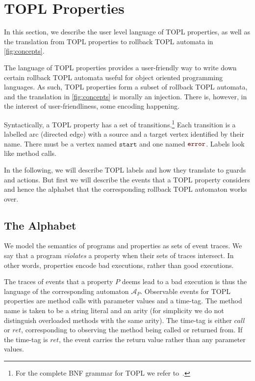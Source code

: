 \documentclass[9pt, preprint]{sigplanconf} %
\newcommand{\A}{\ensuremath{\mathcal{A}}}
\newcommand{\error}{\ensuremath{\textcolor{darkred}{\mathtt{error}}}\xspace}
\newcommand{\start}{\ensuremath{\mathtt{start}}\xspace}
\theoremstyle{definition}
\theoremstyle{remark}
\begin{document}
\section{TOPL Properties}\label{sec:topl} %

In this section, we describe the user level language of TOPL
properties, as well as the translation from TOPL properties to
rollback TOPL automata in \autoref{fig:concepts}.

The language of TOPL properties provides a user-friendly way to write down certain
rollback TOPL automata useful for object oriented programming
languages. As such, TOPL properties form a subset of rollback TOPL
automata, and the translation in \autoref{fig:concepts} is morally an
injection. There is, however, in the interest of user-friendliness,
some encoding happening.

Syntactically, a TOPL property has a set of transitions.\footnote{For
  the complete BNF grammar for TOPL we refer to~\cite{our-fool2011}.}
Each transition is a labelled arc (directed edge) with a source and a
target vertex identified by their name.
There must be a vertex named \start and one named \error.
Labels look like method calls.

In the following, we will describe TOPL labels and how they translate to guards
and actions. But first we will describe the events that a TOPL
property considers and hence the alphabet that the corresponding
rollback TOPL automaton works over.

\subsection{The Alphabet}

We model the semantics of programs and properties as sets of event
traces. We say that a program \emph{violates} a property when their sets of traces intersect.
In other words, properties encode bad executions, rather than good executions.

The traces of events that a property $P$ deems lead to a bad execution is thus the language
of the corresponding automaton $\A_P$. Observable events for TOPL properties are method calls
with parameter values and a time-tag. The method name is taken to be a
string literal and an arity (for simplicity we do not distinguish
overloaded methods with the same arity). The time-tag is either $call$ or $ret$,
corresponding to observing the method being called or returned
from. If the time-tag is $ret$, the event carries the return value
rather than any parameter values.
\end{document}
